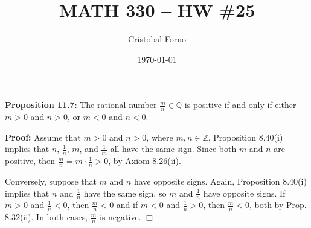 \documentclass[12pt]{article}
\title{MATH 330 -- HW \#25}
\author{Cristobal Forno}
\date{\today}
\begin{document}
\maketitle

\textbf{Proposition 11.7}: The rational number $\frac{m}{n} \in \mathbb{Q}$ is
positive if and only if either $m > 0$ and $n > 0$, or $m < 0$ and $n < 0$.

\textbf{Proof:} Assume that $m > 0$ and $n > 0$, where $m, n \in \mathbb{Z}$.
Proposition 8.40(i) implies that $n$, $\frac{1}{n}$, $m$, and $\frac{1}{m}$ all
have the same sign. Since both $m$ and $n$ are positive, then $\frac{m}{n} = m \cdot
\frac{1}{n} > 0$, by Axiom 8.26(ii).

Conversely, suppose that $m$ and $n$ have opposite signs. Again, Proposition
8.40(i) implies that $n$ and $\frac{1}{n}$ have the same sign, so $m$ and
$\frac{1}{n}$ have opposite signs. If $m > 0$ and $\frac{1}{n} < 0$, then
$\frac{m}{n} < 0$ and if $m < 0$ and $\frac{1}{n} > 0$, then $\frac{m}{n} < 0$,
both by Prop. 8.32(ii). In both cases, $\frac{m}{n}$ is negative. $\Box$
\end{document}
